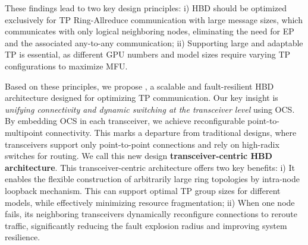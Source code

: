 These findings lead to two key design principles: i) HBD should be optimized exclusively for TP Ring-Allreduce communication with large message sizes, which communicates with only logical neighboring nodes, eliminating the need for EP and the associated any-to-any communication; ii) Supporting large and adaptable TP is essential, as different GPU numbers and model sizes require varying TP configurations to maximize MFU.


Based on these principles, we propose \textbf{\sys}, a scalable and fault-resilient HBD architecture designed for optimizing TP communication. Our key insight is \textit{unifying connectivity and dynamic switching at the transceiver level} using OCS. By embedding OCS in each transceiver, we achieve reconfigurable point-to-multipoint connectivity. This marks a departure from traditional designs, where transceivers support only point-to-point connections and rely on high-radix switches for routing. We call this new design \textbf{transceiver-centric HBD architecture}. This transceiver-centric architecture offers two key benefits: i) It enables the flexible construction of arbitrarily large ring topologies by intra-node loopback mechanism. This can support optimal TP group sizes for different models, while effectively minimizing resource fragmentation; ii) When one node fails, its neighboring transceivers dynamically reconfigure connections to reroute traffic, significantly reducing the fault explosion radius and improving system resilience.

